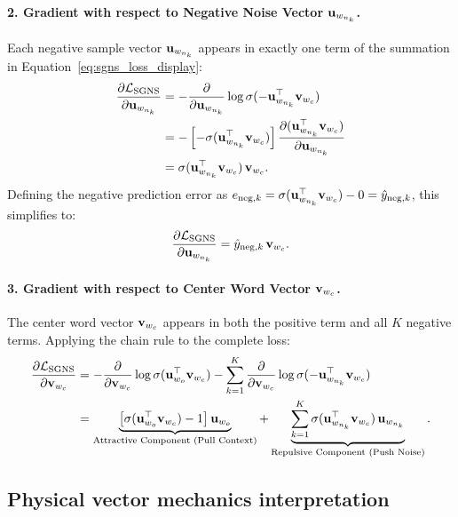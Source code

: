 \documentclass[../../main.tex]{subfiles}
\begin{document}
\paragraph{2. Gradient with respect to Negative Noise Vector $\mathbf{u}_{w_{n_k}}$.}
Each negative sample vector $\mathbf{u}_{w_{n_k}}$ appears in exactly one term of the summation in Equation~\eqref{eq:sgns_loss_display}:
\begin{align}
\frac{\partial \mathcal{L}_{\text{SGNS}}}{\partial \mathbf{u}_{w_{n_k}}} &= -\frac{\partial}{\partial \mathbf{u}_{w_{n_k}}} \log \sigma(-\mathbf{u}_{w_{n_k}}^\top \mathbf{v}_{w_c}) \notag \\
&= -\left[ -\sigma(\mathbf{u}_{w_{n_k}}^\top \mathbf{v}_{w_c}) \right] \frac{\partial (\mathbf{u}_{w_{n_k}}^\top \mathbf{v}_{w_c})}{\partial \mathbf{u}_{w_{n_k}}} \notag \\
\label{eq:grad_u_neg}
&= \sigma(\mathbf{u}_{w_{n_k}}^\top \mathbf{v}_{w_c}) \, \mathbf{v}_{w_c}.
\end{align}
Defining the negative prediction error as $e_{\text{neg}, k} = \sigma(\mathbf{u}_{w_{n_k}}^\top \mathbf{v}_{w_c}) - 0 = \hat{y}_{\text{neg}, k}$, this simplifies to:
\begin{equation}
\label{eq:grad_u_neg_clean}
\frac{\partial \mathcal{L}_{\text{SGNS}}}{\partial \mathbf{u}_{w_{n_k}}} = \hat{y}_{\text{neg}, k} \, \mathbf{v}_{w_c}.
\end{equation}

\paragraph{3. Gradient with respect to Center Word Vector $\mathbf{v}_{w_c}$.}
The center word vector $\mathbf{v}_{w_c}$ appears in both the positive term and all $K$ negative terms. Applying the chain rule to the complete loss:
\begin{align}
\frac{\partial \mathcal{L}_{\text{SGNS}}}{\partial \mathbf{v}_{w_c}} &= -\frac{\partial}{\partial \mathbf{v}_{w_c}} \log \sigma(\mathbf{u}_{w_o}^\top \mathbf{v}_{w_c}) - \sum_{k=1}^K \frac{\partial}{\partial \mathbf{v}_{w_c}} \log \sigma(-\mathbf{u}_{w_{n_k}}^\top \mathbf{v}_{w_c}) \notag \\
\label{eq:grad_v_center}
&= \underbrace{\left[ \sigma(\mathbf{u}_{w_o}^\top \mathbf{v}_{w_c}) - 1 \right] \mathbf{u}_{w_o}}_{\text{Attractive Component (Pull Context)}} + \underbrace{\sum_{k=1}^K \sigma(\mathbf{u}_{w_{n_k}}^\top \mathbf{v}_{w_c}) \, \mathbf{u}_{w_{n_k}}}_{\text{Repulsive Component (Push Noise)}}.
\end{align}

\subsection{Physical vector mechanics interpretation}
\label{subsec:vector_mechanics}
\end{document}
